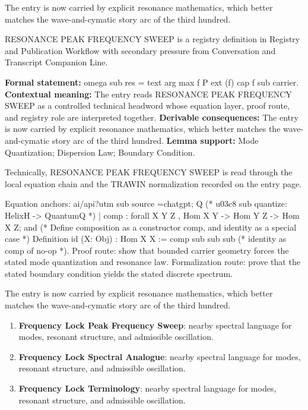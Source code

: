 The entry is now carried by explicit resonance mathematics, which better matches the wave-and-cymatic story arc of the third hundred.
\clearpage


\begingroup\small
{}
RESONANCE PEAK FREQUENCY SWEEP is a registry definition in Registry and Publication Workflow with secondary pressure from Conversation and Transcript Companion Line.

\begingroup\footnotesize\setlength{\emergencystretch}{3em}\sloppy
\textbf{Formal statement:} omega sub res = text arg max f P ext (f) cap f sub carrier. \textbf{Contextual meaning:} The entry reads RESONANCE PEAK FREQUENCY SWEEP as a controlled technical headword whose equation layer, proof route, and registry role are interpreted together. \textbf{Derivable consequences:} The entry is now carried by explicit resonance mathematics, which better matches the wave-and-cymatic story arc of the third hundred. \textbf{Lemma support:} Mode Quantization; Dispersion Law; Boundary Condition.\par
\endgroup

Technically, RESONANCE PEAK FREQUENCY SWEEP is read through the local equation chain and the TRAWIN normalization recorded on the entry page.

Equation anchors: ai/api?utm sub source =chatgpt; Q (* u03c8 sub quantize: HelixH -> QuantumQ *) | comp : forall X Y Z , Hom X Y -> Hom Y Z -> Hom X Z; and (* Define composition as a constructor comp, and identity as a special case *) Definition id (X: Obj) : Hom X X := comp sub sub sub (* identity as comp of no-op *). Proof route: show that bounded carrier geometry forces the stated mode quantization and resonance law. Formalization route: prove that the stated boundary condition yields the stated discrete spectrum.

The entry is now carried by explicit resonance mathematics, which better matches the wave-and-cymatic story arc of the third hundred.
\endgroup

\begin{enumerate}[leftmargin=1.6em,itemsep=6pt,topsep=4pt]
\item \textbf{Frequency Lock Peak Frequency Sweep}: nearby spectral language for modes, resonant structure, and admissible oscillation.
\item \textbf{Frequency Lock Spectral Analogue}: nearby spectral language for modes, resonant structure, and admissible oscillation.
\item \textbf{Frequency Lock Terminology}: nearby spectral language for modes, resonant structure, and admissible oscillation.
\end{enumerate}

